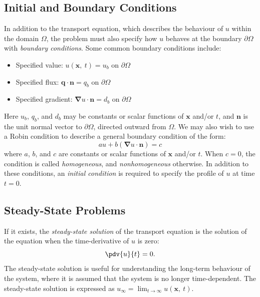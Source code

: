 \documentclass{article}
\begin{document}
\subsection{Initial and Boundary Conditions}
In addition to the transport equation, which describes the behaviour of
\(u\) within the domain \(\Omega\), the problem must also specify how
\(u\) behaves at the boundary \(\partial \Omega\) with \textit{boundary
conditions}. Some common boundary conditions include:
\begin{itemize}
    \item Specified value: \(u\left( \symbf{x},\: t \right) = u_b\) on
          \(\partial \Omega\)
    \item Specified flux: \(\symbf{q} \cdot \symbf{n} = q_b\) on
          \(\partial \Omega\)
    \item Specified gradient: \(\symbf{\nabla} u \cdot \symbf{n} =
          d_b\) on \(\partial \Omega\)
\end{itemize}
Here \(u_b\), \(q_b\), and \(d_b\) may be constants or scalar functions
of \(\symbf{x}\) and/or \(t\), and \(\symbf{n}\) is the unit normal vector
to \(\partial \Omega\), directed outward from \(\Omega\).
We may also wish to use a Robin condition to describe a general
boundary condition of the form:
\begin{equation*}
    a u + b \left( \symbf{\nabla} u \cdot \symbf{n} \right) = c
\end{equation*}
where \(a\), \(b\), and \(c\) are constants or scalar functions of
\(\symbf{x}\) and/or \(t\). When \(c = 0\), the condition is called
\textit{homogeneous}, and \textit{nonhomogeneous} otherwise.
In addition to these conditions, an \textit{initial condition} is
required to specify the profile of \(u\) at time \(t = 0\).
\subsection{Steady-State Problems}
If it exists, the \textit{steady-state solution} of the transport
equation is the solution of the equation when the time-derivative of
\(u\) is zero:
\begin{equation*}
    \pdv{u}{t} = 0.
\end{equation*}
The steady-state solution is useful for understanding the long-term
behaviour of the system, where it is assumed that the system is no longer
time-dependent. The steady-state solution is expressed as
\(u_\infty = \lim_{t \to \infty} u\left( \symbf{x},\: t \right)\).
\end{document}
